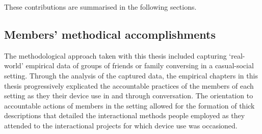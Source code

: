 \noindent These contributions are summarised in the following sections.






\subsection{Members' methodical accomplishments}\label{sec:synopsis conclusions machinery}
The methodological approach taken with this thesis included capturing `real-world' empirical data of groups of friends or family conversing in a casual-social setting.
Through the analysis of the captured data, the empirical chapters in this thesis progressively explicated the accountable practices of the members of each setting as they  their device use in and through conversation.
The orientation to accountable actions of members in the setting allowed for the formation of thick descriptions that detailed the interactional methods people employed as they attended to the interactional projects for which device use was occasioned.

